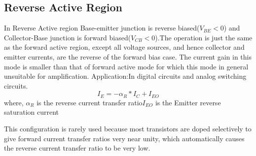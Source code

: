 		\subsection{Reverse Active Region}
			In Reverse Active region Base-emitter junction is reverse biased(\(V_{BE}<0\)) and Collector-Base junction is forward biased(\(V_{CB}<0\)).The operation is just the same as the forward active region, except all voltage sources, and hence collector and emitter currents, are the reverse of the forward bias case. The current gain in this mode is smaller than that of forward active mode for which this mode in general unsuitable for amplification.
			Application:In digital circuits and analog switching circuits.						
			$$I_E = -\alpha_R* I_C + I_{EO}$$ where,
			\(\alpha_R\) is the reverse current transfer ratio\newline \(I_{EO}\) is the Emitter reverse saturation current
			
			This configuration is rarely used because most transistors are doped selectively to give forward current transfer ratios very near unity, which automatically causes the reverse current transfer ratio to be very low.
		
